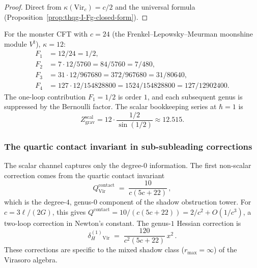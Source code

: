 \begin{proof}
Direct from $\kappa(\mathrm{Vir}_c) = c/2$ and the universal formula (Proposition~\ref{prop:thqg-I-Fg-closed-form}).
\end{proof}

\begin{remark}[Numerical values for $c = 24$ (monster CFT)]
\label{rem:thqg-I-monster}
For the monster CFT with $c = 24$ (the Frenkel--Lepowsky--Meurman moonshine module $V^\natural$), $\kappa = 12$:
\begin{align*}
F_1 &= 12/24 = 1/2, \\
F_2 &= 7 \cdot 12/5760 = 84/5760 = 7/480, \\
F_3 &= 31 \cdot 12/967680 = 372/967680 = 31/80640, \\
F_4 &= 127 \cdot 12/154828800 = 1524/154828800 = 127/12902400.
\end{align*}
The one-loop contribution $F_1 = 1/2$ is order $1$, and each
subsequent genus is suppressed by the Bernoulli factor. The scalar
bookkeeping series at $\hbar = 1$ is
\[
Z_{\mathrm{grav}}^{\mathrm{scal}} = 12 \cdot \frac{1/2}{\sin(1/2)}
\approx 12.515.
\]
\end{remark}

\subsubsection{The quartic contact invariant in sub-subleading corrections}

\begin{remark}
\label{rem:thqg-I-quartic-3d}
The scalar channel captures only the degree-$0$ information. The first non-scalar correction comes from the quartic contact invariant
\begin{equation}\label{eq:thqg-I-quartic-contact}
Q^{\mathrm{contact}}_{\mathrm{Vir}} \;=\; \frac{10}{c(5c+22)}\,,
\end{equation}
which is the degree-$4$, genus-$0$ component of the shadow obstruction tower. For $c = 3\ell/(2G)$, this gives $Q^{\mathrm{contact}} = 10/(c(5c+22)) = 2/c^2 + O(1/c^3)$, a two-loop correction in Newton's constant. The genus-$1$ Hessian correction is
\begin{equation}\label{eq:thqg-I-genus1-hessian}
\delta_H^{(1)}_{\mathrm{Vir}} \;=\; \frac{120}{c^2(5c+22)}\,x^2\,.
\end{equation}
These corrections are specific to the mixed shadow class ($r_{\max} = \infty$) of the Virasoro algebra.
\end{remark}

